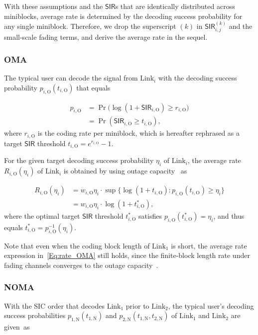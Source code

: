 \documentclass[conference]{IEEEtran}
\def\SIR{\mathsf{SIR}}
\def\({\left(}
\def\){\right)}
\def\OMA{\text{O}}
\def\NOMA{\text{N}}
\def\L{\text{Link}}
\begin{document}
With these assumptions and the $\SIR$s that are identically distributed across miniblocks, average rate is determined by the decoding success probability for any single miniblock. Therefore, we drop the superscript $(k)$ in $\SIR_{i,j}^{(k)}$ and the small-scale fading terms, and derive the average rate in the sequel.



\subsubsection{OMA}
The typical user can decode the signal from $\L_i$ with the decoding success probability $p_{i,\OMA}(t_{i,\OMA})$ that equals

\vspace{-10pt}\small\begin{align}
p_{i,\OMA} &= \Pr\big(\log(1+\SIR_{i,\OMA})\geq r_{i,\OMA}  \big)\\
&= \Pr\(\SIR_{i,\OMA} \geq t_{i,\OMA}\), \label{Eq:success_OMA}
\end{align}\normalsize
where $r_{i,\OMA}$ is the coding rate per miniblock, which is hereafter rephrased as a target $\SIR$ threshold $t_{i,\OMA}= e^{r_{i,\OMA}}-1$.

For the given target decoding success probability $\eta_i$ of $\L_i$, the average rate $R_{i,\OMA}(\eta_i)$ of $\L_i$ is obtained by using outage capacity~\cite{TseOC:07} as

\vspace{-10pt}\small\begin{align}
R_{i,\OMA}(\eta_i) &= w_{i,\OMA} \eta_i  \cdot \sup\{\log(1 + t_{i,\OMA}): p_{i,\OMA}(t_{i,\OMA})\geq \eta_i\} \\
		&= w_{i,\OMA} \eta_i \cdot \log(1 + t_{i,\OMA}^* ), \label{Eq:rate_OMA}
\end{align}\normalsize
where the optimal target $\SIR$ threshold $t_{i,\OMA}^*$ satisfies $p_{i,\OMA}(t_{i,\OMA}^*)=\eta_i$, and thus equals $t_{i,\OMA}^* = p_{i,\OMA}^{-1}(\eta_i)$. 

Note that even when the coding block length of $\L_1$ is short, the average rate expression in~\eqref{Eq:rate_OMA} still holds, since the finite-block length rate under fading channels converges to the outage capacity~\cite{DurisiPolyanski:14}. 



\subsubsection{NOMA}
With the SIC order that decodes $\L_1$ prior to $\L_2$, the typical user's decoding success probabilities $p_{1,\NOMA}(t_{1,\NOMA})$ and $p_{2,\NOMA}(t_{1,\NOMA},t_{2,\NOMA})$ of $\L_1$ and $\L_2$ are given~as
\end{document}
